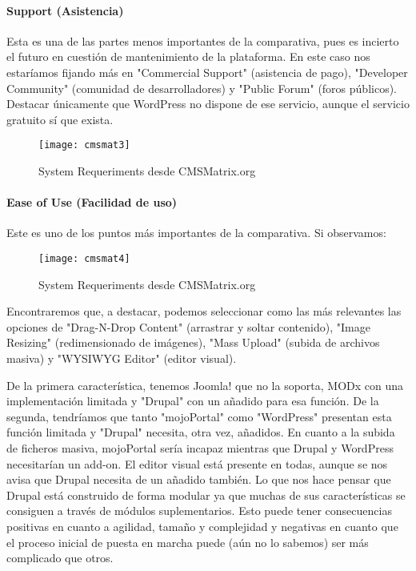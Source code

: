 \paragraph{Support (Asistencia)}

\par Esta es una de las partes menos importantes de la comparativa, pues es incierto el futuro en cuestión de mantenimiento de la plataforma. En este caso nos estaríamos fijando más en "Commercial Support" (asistencia de pago), "Developer Community" (comunidad de desarrolladores) y "Public Forum" (foros públicos). Destacar únicamente que WordPress no dispone de ese servicio, aunque el servicio gratuito sí que exista.

\begin{figure}
\begin{narrow}{-0.2\linewidth}{-0.2\linewidth}
\centering
\texttt{[image: cmsmat3]}
\caption{System Requeriments desde CMSMatrix.org}
\end{narrow}
\label{fig:cmsmat1}
\end{figure}

\paragraph{Ease of Use (Facilidad de uso)}

\par Este es uno de los puntos más importantes de la comparativa. Si observamos:

\begin{figure}
\begin{narrow}{-0.2\linewidth}{-0.2\linewidth}
\centering
\texttt{[image: cmsmat4]}
\caption{System Requeriments desde CMSMatrix.org}
\end{narrow}
\label{fig:cmsmat1}
\end{figure}

\par Encontraremos que, a destacar, podemos seleccionar como las más relevantes las opciones de "Drag-N-Drop Content" (arrastrar y soltar contenido), "Image Resizing" (redimensionado de imágenes), "Mass Upload" (subida de archivos masiva) y "WYSIWYG Editor" (editor visual).
\par De la primera característica, tenemos Joomla! que no la soporta, MODx con una implementación limitada y "Drupal" con un añadido para esa función. De la segunda, tendríamos que tanto "mojoPortal" como "WordPress" presentan esta función limitada y "Drupal" necesita, otra vez, añadidos. En cuanto a la subida de ficheros masiva, mojoPortal sería incapaz mientras que Drupal y WordPress necesitarían un add-on. El editor visual está presente en todas, aunque se nos avisa que Drupal necesita de un añadido también. Lo que nos hace pensar que Drupal está construido de forma modular ya que muchas de sus características se consiguen a través de módulos suplementarios. Esto puede tener consecuencias positivas en cuanto a agilidad, tamaño y complejidad y negativas en cuanto que el proceso inicial de puesta en marcha puede (aún no lo sabemos) ser más complicado que otros.



